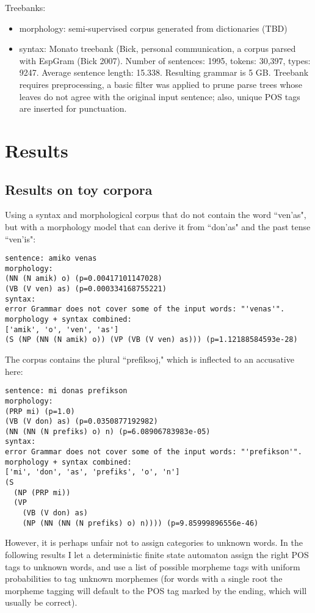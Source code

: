 \documentclass[10pt,a4paper]{article}
\begin{document}
Treebanks:

\begin{itemize}
\item morphology: semi-supervised corpus generated from dictionaries (TBD)
\item syntax: Monato treebank (Bick, personal communication, a corpus parsed
      with EspGram (Bick 2007).  Number of sentences: 1995, tokens: 30,397,
      types: 9247. Average sentence length: 15.338. Resulting grammar is 5 GB.
      Treebank requires preprocessing, a basic filter was applied to prune
      parse trees whose leaves do not agree with the original input sentence;
      also, unique POS tags are inserted for punctuation.
\end{itemize}

\section{Results}
\subsection{Results on toy corpora}

Using a syntax and morphological corpus that do not contain the word ``ven'as",
but with a morphology model that can derive it from ``don'as" and the past
tense ``ven'is":

\begin{verbatim}
sentence: amiko venas
morphology:
(NN (N amik) o) (p=0.00417101147028)
(VB (V ven) as) (p=0.000334168755221)
syntax:
error Grammar does not cover some of the input words: "'venas'".
morphology + syntax combined:
['amik', 'o', 'ven', 'as']
(S (NP (NN (N amik) o)) (VP (VB (V ven) as))) (p=1.12188584593e-28)
\end{verbatim}

The corpus contains the plural ``prefiksoj," which is inflected to an accusative here:

\begin{verbatim}
sentence: mi donas prefikson
morphology:
(PRP mi) (p=1.0)
(VB (V don) as) (p=0.0350877192982)
(NN (NN (N prefiks) o) n) (p=6.08906783983e-05)
syntax:
error Grammar does not cover some of the input words: "'prefikson'".
morphology + syntax combined:
['mi', 'don', 'as', 'prefiks', 'o', 'n']
(S
  (NP (PRP mi))
  (VP
    (VB (V don) as)
    (NP (NN (NN (N prefiks) o) n)))) (p=9.85999896556e-46)
\end{verbatim}

However, it is perhaps unfair not to assign categories to unknown words. 
In the following results I let a deterministic finite state automaton
assign the right POS tags to unknown words, and use a list of possible
morpheme tags with uniform probabilities to tag unknown morphemes (for words
with a single root the morpheme tagging will default to the POS tag marked
by the ending, which will usually be correct).
\end{document}
